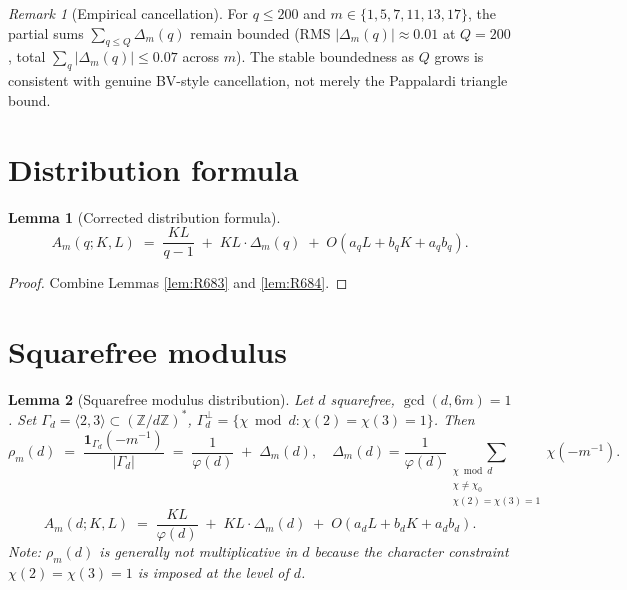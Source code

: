 \documentclass[12pt]{amsart}
\newtheorem{lemma}{Lemma}
\theoremstyle{definition}
\theoremstyle{remark}
\newtheorem{remark}{Remark}
\begin{document}
\begin{remark}[Empirical cancellation]
For $q \le 200$ and $m \in \{1, 5, 7, 11, 13, 17\}$, the partial sums
$\sum_{q \le Q} \Delta_m(q)$ remain bounded (RMS $|\Delta_m(q)| \approx 0.01$ at $Q = 200$,
total $\sum_q |\Delta_m(q)| \le 0.07$ across $m$). The stable boundedness as $Q$ grows is
consistent with genuine BV-style cancellation, not merely the Pappalardi triangle bound.
\end{remark}

\section{Distribution formula}

\begin{lemma}[Corrected distribution formula]\label{lem:R685}
$$
A_m(q; K, L)
\;=\;
\frac{KL}{q - 1}
\;+\;
KL \cdot \Delta_m(q)
\;+\;
O(a_q L + b_q K + a_q b_q).
$$
\end{lemma}

\begin{proof}
Combine Lemmas \ref{lem:R683} and \ref{lem:R684}.
\end{proof}

\section{Squarefree modulus}

\begin{lemma}[Squarefree modulus distribution]\label{lem:R686}
Let $d$ squarefree, $\gcd(d, 6m) = 1$. Set $\Gamma_d = \langle 2, 3 \rangle \subset (\mathbb{Z}/d\mathbb{Z})^*$,
$\Gamma_d^\perp = \{\chi \bmod d : \chi(2) = \chi(3) = 1\}$. Then
$$
\rho_m(d)
\;=\;
\frac{\mathbf{1}_{\Gamma_d}(-m^{-1})}{|\Gamma_d|}
\;=\;
\frac{1}{\varphi(d)}
\;+\;
\Delta_m(d),
\quad
\Delta_m(d) = \frac{1}{\varphi(d)}
\sum_{\substack{\chi \bmod d \\ \chi \ne \chi_0 \\ \chi(2) = \chi(3) = 1}}
\chi(-m^{-1}).
$$
$$
A_m(d; K, L)
\;=\;
\frac{KL}{\varphi(d)}
\;+\;
KL \cdot \Delta_m(d)
\;+\;
O(a_d L + b_d K + a_d b_d).
$$
Note: $\rho_m(d)$ is generally not multiplicative in $d$ because the character constraint
$\chi(2) = \chi(3) = 1$ is imposed at the level of $d$.
\end{lemma}
\end{document}
